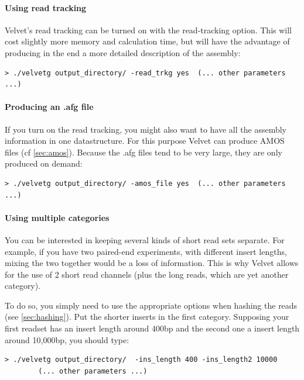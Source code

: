 \documentclass{article}
\begin{document}
	\paragraph{Using read tracking} 
	
Velvet's read tracking can be turned on with the read-tracking option. This will cost slightly more memory and calculation time, but will have the advantage of producing in the end a more detailed description of the assembly:

\begin{verbatim}
> ./velvetg output_directory/ -read_trkg yes  (... other parameters ...)
\end{verbatim}

	\paragraph{Producing an .afg file}
	
If you turn on the read tracking, you might also want to have all the  assembly information in one datastructure. For this purpose Velvet can produce AMOS files (cf \ref{sec:amos}). Because the .afg files tend to be very large, they are only produced on demand:

\begin{verbatim}
> ./velvetg output_directory/ -amos_file yes  (... other parameters ...)
\end{verbatim}

	\paragraph{Using multiple categories}

You can be interested in keeping several kinds of short read sets separate.
For example, if you have two paired-end experiments, with different insert
lengths, mixing the two together would be a loss of information. This is why
Velvet allows for the use of 2 short read channels (plus the long reads, which
are yet another category).

To do so, you simply need to use the appropriate options when hashing the
reads (see \ref{sec:hashing}). Put the shorter inserts in the first category. Supposing your first  readset has an insert length around 400bp and the second one a insert length around 10,000bp, you should type:

\begin{verbatim}
> ./velvetg output_directory/  -ins_length 400 -ins_length2 10000  
		(... other parameters ...)
\end{verbatim}
\end{document}

